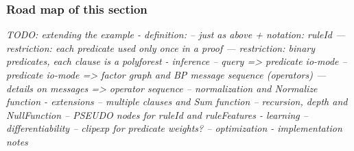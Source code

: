 \documentclass[12pt]{article}
\newcommand{\yy}[1]{\textit{TODO: {#1}}}
\begin{document}
\subsubsection{Road map of this section}

\yy{extending the example  
 - definition: 
 -- just as above + notation: {ruleId}
 --- restriction: each predicate used only once in a proof
 --- restriction: binary predicates, each clause is a polyforest
 - inference
 -- query => predicate io-mode 
 -- predicate io-mode => factor graph and BP message sequence (operators)
 --- details on messages => operator sequence
 -- normalization and Normalize function
 - extensions
 -- multiple clauses and Sum function
 -- recursion, depth and NullFunction
 -- PSEUDO nodes for ruleId and ruleFeatures
 - learning
 -- differentiability
 -- clipexp for predicate weights?
 -- optimization
 - implementation notes
}
\end{document}
